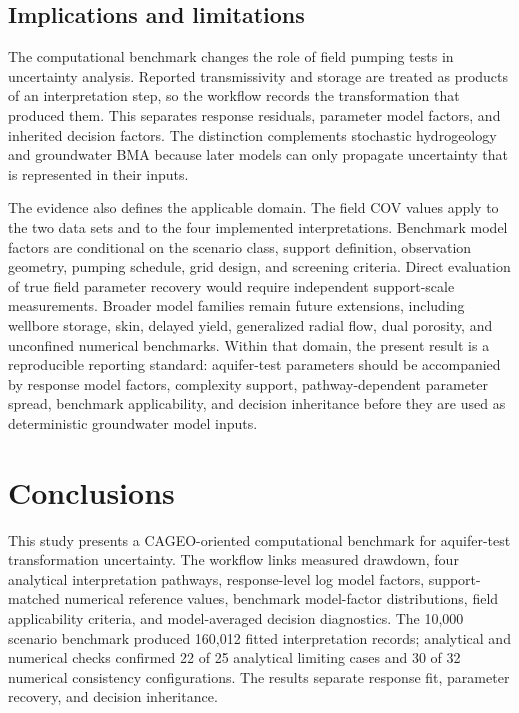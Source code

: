 \documentclass[a4paper,fleqn]{cas-sc}
\begin{document}
\subsection{Implications and limitations}

The computational benchmark changes the role of field pumping tests in uncertainty analysis. Reported transmissivity and storage are treated as products of an interpretation step, so the workflow records the transformation that produced them. This separates response residuals, parameter model factors, and inherited decision factors. The distinction complements stochastic hydrogeology and groundwater BMA because later models can only propagate uncertainty that is represented in their inputs.

The evidence also defines the applicable domain. The field COV values apply to the two data sets and to the four implemented interpretations. Benchmark model factors are conditional on the scenario class, support definition, observation geometry, pumping schedule, grid design, and screening criteria. Direct evaluation of true field parameter recovery would require independent support-scale measurements. Broader model families remain future extensions, including wellbore storage, skin, delayed yield, generalized radial flow, dual porosity, and unconfined numerical benchmarks. Within that domain, the present result is a reproducible reporting standard: aquifer-test parameters should be accompanied by response model factors, complexity support, pathway-dependent parameter spread, benchmark applicability, and decision inheritance before they are used as deterministic groundwater model inputs.

\section{Conclusions}

This study presents a CAGEO-oriented computational benchmark for aquifer-test transformation uncertainty. The workflow links measured drawdown, four analytical interpretation pathways, response-level log model factors, support-matched numerical reference values, benchmark model-factor distributions, field applicability criteria, and model-averaged decision diagnostics. The 10,000 scenario benchmark produced 160,012 fitted interpretation records; analytical and numerical checks confirmed 22 of 25 analytical limiting cases and 30 of 32 numerical consistency configurations. The results separate response fit, parameter recovery, and decision inheritance.
\end{document}
